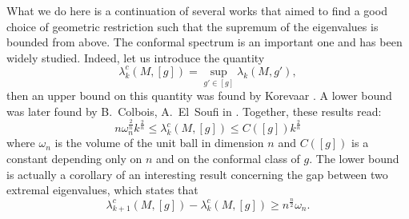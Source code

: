 \documentclass[12pt,reqno]{amsart}		%
\theoremstyle{plain}
\theoremstyle{definition}
\theoremstyle{remark}
\numberwithin{equation}{section}
\begin{document}

What we do here is a continuation of several works that aimed to find a good choice of geometric restriction such that the supremum of the eigenvalues is bounded from above. The conformal spectrum is an important one and has been widely studied. Indeed, let us introduce the quantity
\begin{equation*}
\lambda_k^c(M,[g]) = \underset{g'\in [g]}{\sup} \lambda_k(M,g'),
\end{equation*}
then an upper bound on this quantity was found by Korevaar \cite[Theorem 0.4]{korevaar_1993}. A lower bound was later found by B.~Colbois, A.~El~Soufi in \cite[Corollary 1]{colbois_soufi_2003}. Together, these results read:
\begin{equation}
\label{encadrement_conforme}
n\omega_n^{\frac{2}{n}}k^{\frac{2}{n}}
\leqslant \lambda_k^c(M,[g])
\leqslant C([g])k^{\frac{2}{n}}
\end{equation}
where $\omega_n$ is the volume of the unit ball in dimension $n$ and $C([g])$ is a constant depending only on $n$ and on the conformal class of $g$. The lower bound is actually a corollary of an interesting result concerning the gap between two extremal eigenvalues, which states that
\begin{equation*}
\lambda_{k+1}^c(M,[g])-\lambda_k^c(M,[g]) \geqslant n^{\frac{n}{2}}\omega_n.
\end{equation*} 
 
\end{document}
